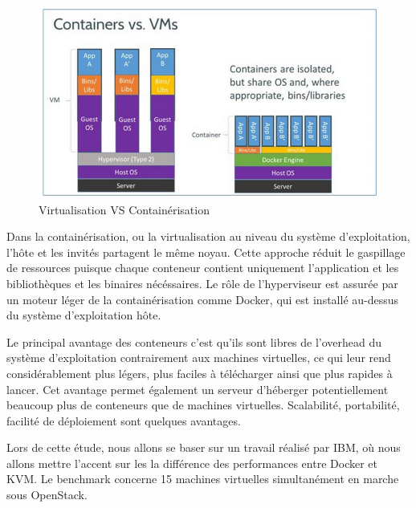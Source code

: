 \begin{onehalfspace}
\begin{figure}[H]
\centering
\includegraphics [scale=0.5]{chapitre2/assets/vm-container.png}
\caption{Virtualisation VS Containérisation}
\end{figure}


Dans la containérisation, ou la virtualisation au niveau du système d'exploitation, l'hôte et les invités partagent le même noyau. Cette approche réduit le gaspillage de ressources puisque chaque conteneur contient uniquement l'application et les bibliothèques et les binaires nécéssaires. Le rôle de l'hyperviseur est assurée par un moteur léger de la containérisation comme Docker, qui est installé au-dessus du système d'exploitation hôte.

Le principal avantage des conteneurs c'est qu'ils sont libres de l'overhead du système d'exploitation contrairement aux machines virtuelles, ce qui leur rend considérablement plus légers, plus faciles à télécharger ainsi que plus rapides à lancer. Cet avantage permet également un serveur d'héberger potentiellement beaucoup plus de conteneurs que de machines virtuelles. Scalabilité, portabilité, facilité de déploiement sont quelques avantages.


Lors de cette étude, nous allons se baser sur un travail réalisé par IBM\cite{ibm-benchmark-docker}, où nous allons mettre l'accent sur les la différence des performances entre Docker et KVM. Le benchmark concerne 15 machines virtuelles simultanément en marche sous OpenStack.


\def\arraystretch{1.4}%


{
\begin{center}
\begin{table}[H]

	\centering


\end{table}
\end{center}}
\end{onehalfspace}
